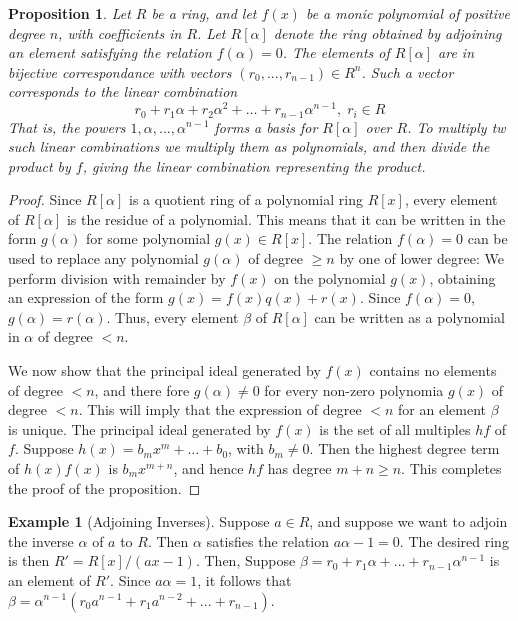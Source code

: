 \documentclass[12pt]{article}
\newtheorem{prop}[thm]{Proposition}
\theoremstyle{definition}
\newtheorem{eg}[thm]{Example}
\theoremstyle{remark}
\numberwithin{equation}{section}
\begin{document}
\begin{prop}
        Let $R$ be a ring, and let $f(x)$ be a monic polynomial of positive degree $n$, with coefficients in $R$. Let $R[\alpha]$ denote the ring obtained by adjoining an element satisfying the relation $f(\alpha) = 0$. The elements of $R[\alpha]$ are in bijective correspondance with vectors $(r_0,...,r_{n-1}) \in R^n$. Such a vector corresponds to the linear combination \begin{equation}
                r_0+r_1\alpha+r_2\alpha^2+\hdots + r_{n-1}\alpha^{n-1}, \; r_i \in R
        \end{equation}
        That is, the powers $1,\alpha,...,\alpha^{n-1}$ forms a basis for $R[\alpha]$ over $R$. To multiply tw such linear combinations we multiply them as polynomials, and then divide the product by $f$, giving the linear combination representing the product.
\end{prop}
\begin{proof}
        Since $R[\alpha]$ is a quotient ring of a polynomial ring $R[x]$, every element of $R[\alpha]$ is the residue of a polynomial. This means that it can be written in the form $g(\alpha)$ for some polynomial $g(x) \in R[x]$. The relation $f(\alpha) = 0$ can be used to replace any polynomial $g(\alpha)$ of degree $\geq n$ by one of lower degree: We perform division with remainder by $f(x)$ on the polynomial $g(x)$, obtaining an expression of the form $g(x) = f(x)q(x) + r(x)$. Since $f(\alpha) = 0$, $g(\alpha) = r(\alpha)$. Thus, every element $\beta$ of $R[\alpha]$ can be written as a polynomial in $\alpha$ of degree $< n$.


        We now show that the principal ideal generated by $f(x)$ contains no elements of degree $< n$, and there fore $g(\alpha) \neq 0$ for every non-zero polynomia $g(x)$ of degree $< n$. This will imply that the expression of degree $< n$ for an element $\beta$ is unique. The principal ideal generated by $f(x)$ is the set of all multiples $hf$ of $f$. Suppose $h(x) = b_mx^m+\hdots + b_0$, with $b_m \neq 0$. Then the highest degree term of $h(x)f(x)$ is $b_mx^{m+n}$, and hence $hf$ has degree $m+n \geq n$. This completes the proof of the proposition.
\end{proof}


\vspace{15pt}


\begin{eg}[Adjoining Inverses]
        Suppose $a \in R$, and suppose we want to adjoin the inverse $\alpha$ of $a$ to $R$. Then $\alpha$ satisfies the relation $a\alpha - 1 = 0$. The desired ring is then $R' = R[x]/(ax - 1)$. Then, Suppose $\beta = r_0 + r_1\alpha + ... + r_{n-1}\alpha^{n-1}$ is an element of $R'$. Since $a\alpha = 1$, it follows that $\beta = \alpha^{n-1}(r_0a^{n-1}+r_1a^{n-2}+...+r_{n-1})$.
\end{eg}
\end{document}
